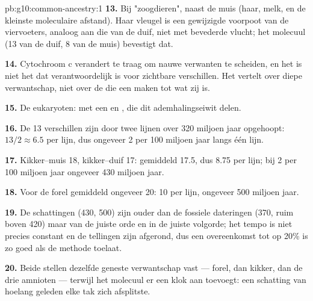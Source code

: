 \begin{solution}{pb:g10:common-ancestry:1}
\textbf{13.} Bij "zoogdieren", naast de muis (haar, melk, en de kleinste
moleculaire afstand). Haar vleugel is een gewijzigde voorpoot van de
viervoeters, analoog aan die van de duif, niet  met bevederde
vlucht; het molecuul (13 van de duif, 8 van de muis) bevestigt dat.

\textbf{14.} Cytochroom c verandert te traag om nauwe verwanten te
scheiden, en het is niet het  dat verantwoordelijk is voor zichtbare
verschillen. Het vertelt over diepe verwantschap, niet over de  die
een  maken tot wat zij is.

\textbf{15.} De eukaryoten:  met een  en , die
dit ademhalingseiwit delen.

\textbf{16.} De 13 verschillen zijn door twee lijnen over 320 miljoen jaar
opgehoopt: $13/2 \approx 6.5$ per lijn, dus ongeveer 2 per 100 miljoen
jaar langs één lijn.

\textbf{17.} Kikker--muis 18, kikker--duif 17: gemiddeld 17.5, dus 8.75
per lijn; bij 2 per 100 miljoen jaar ongeveer 430 miljoen jaar.

\textbf{18.} Voor de forel gemiddeld ongeveer 20: 10 per lijn, ongeveer
500 miljoen jaar.

\textbf{19.} De schattingen (430, 500) zijn ouder dan de fossiele
dateringen (370, ruim boven 420) maar van de juiste orde en in de juiste
volgorde; het tempo is niet precies constant en de tellingen zijn
afgerond, dus een overeenkomst tot op 20\% is zo goed als de methode
toelaat.

\textbf{20.} Beide stellen dezelfde geneste verwantschap vast --- forel,
dan kikker, dan de drie amnioten --- terwijl het molecuul er een klok aan
toevoegt: een schatting van hoelang geleden elke tak zich afsplitste.
\end{solution}
